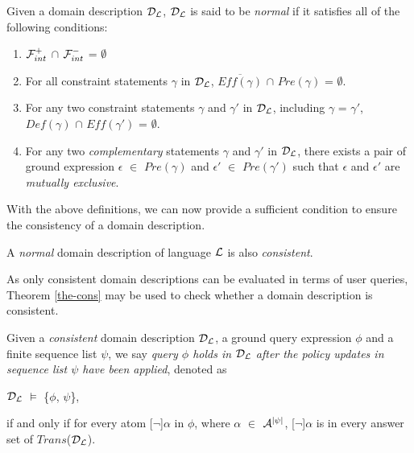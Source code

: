 \documentclass[global,twocolumn,draft]{svjour}
\newenvironment{vdefinition}
  {\begin{definition}\hspace{0.25em}}
  {\end{definition}}
\newenvironment{vtheorem}[1]
  {\begin{theorem}[#1]\hspace{0.25em}}
  {\end{theorem}}
\newenvironment{vquote}
  {\begin{list}{}{\leftmargin 1em}\item[]}
  {\end{list}}
\begin{document}
    \begin{vdefinition}
      \label{def-norm}
      Given a domain description ${\cal D_{L}}$, ${\cal D_{L}}$ is said to
      be {\em normal} if it satisfies all of the following conditions:
      \begin{enumerate}
        \item
          ${\cal F}^{+}_{int}$ $\cap$ ${\cal F}^{-}_{int}$ = $\emptyset$
        \item
          For all constraint statements $\gamma$ in ${\cal D_{L}}$,
          $\overline{Eff(\gamma)}$ $\cap$ $Pre(\gamma)$ = $\emptyset$.
        \item
          For any two constraint statements $\gamma$ and $\gamma'$ in
          ${\cal D_{L}}$, including $\gamma$ = $\gamma'$, $Def(\gamma)$ $\cap$
          $Eff(\gamma')$ = $\emptyset$.
        \item
          For any two {\em complementary} statements $\gamma$ and $\gamma'$ in
          ${\cal D_{L}}$, there exists a pair of ground expression $\epsilon$
          $\in$ $Pre(\gamma)$ and $\epsilon'$ $\in$ $Pre(\gamma')$ such that
          $\epsilon$ and $\epsilon'$ are {\em mutually exclusive}.
      \end{enumerate}
    \end{vdefinition}

    With the above definitions, we can now provide a sufficient condition to
    ensure the consistency of a domain description.

    \begin{vtheorem}{Domain Consistency}
      \label{the-cons}
      A {\em normal} domain description of language ${\cal L}$ is also
      {\em consistent}.
    \end{vtheorem}

    As only consistent domain descriptions can be evaluated in terms of user
    queries, Theorem \ref{the-cons} may be used to check whether a domain
    description is consistent.

    \begin{vdefinition}
      \label{def-eval}
      Given a {\em consistent} domain description ${\cal D}_{\cal L}$, a ground
      query expression $\phi$ and a finite sequence list $\psi$, we say
      {\em query $\phi$ holds in ${\cal D}_{\cal L}$ after the policy updates
      in sequence list $\psi$ have been applied}, denoted as

      \begin{vquote}
        ${\cal D}_{\cal L}$ $\models$ \{$\phi$, $\psi$\},
      \end{vquote}

      \noindent if and only if for every atom [$\lnot$]$\alpha$ in $\phi$,
      where $\alpha$ $\in$ ${\cal A}^{|\psi|}$, [$\lnot$]$\alpha$ is in
      every answer set of $Trans$(${\cal D}_{\cal L}$).
    \end{vdefinition}
\end{document}
